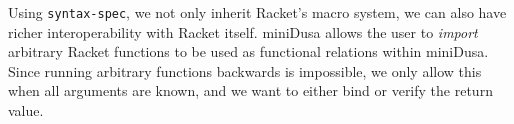 \documentclass[dvipsnames,sigplan,screen,review,anonymous,acmthm,nonacm]{acmart}
\begin{document}
Using \texttt{syntax-spec}, we not only inherit Racket's macro system, we can
also have richer interoperability with Racket itself. miniDusa allows the user
to \emph{import} arbitrary Racket functions to be used as functional relations
within miniDusa. Since running arbitrary functions backwards is impossible, we
only allow this when all arguments are known, and we want to either bind or
verify the return value.










\clearpage


\end{document}
